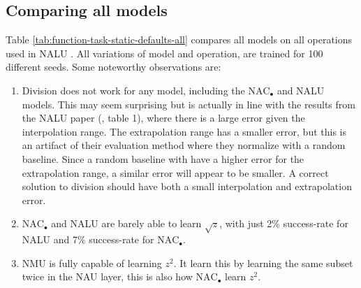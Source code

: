 \subsection{Comparing all models}
\label{sec:appendix:comparison-all-models}

Table \ref{tab:function-task-static-defaults-all} compares all models on all operations used in NALU \cite{trask-nalu}. All variations of model and operation, are trained for 100 different seeds. Some noteworthy observations are:

\begin{enumerate}
    \item Division does not work for any model, including the $\mathrm{NAC}_{\bullet}$ and NALU models. This may seem surprising but is actually in line with the results from the NALU paper (\citet{trask-nalu}, table 1), where there is a large error given the interpolation range. The extrapolation range has a smaller error, but this is an artifact of their evaluation method where they normalize with a random baseline. Since a random baseline with have a higher error for the extrapolation range, a similar error will appear to be smaller. A correct solution to division should have both a small interpolation and extrapolation error.
    \item $\mathrm{NAC}_{\bullet}$ and NALU are barely able to learn $\sqrt{z}$, with just 2\% success-rate for NALU and 7\% success-rate for $\mathrm{NAC}_{\bullet}$.
    \item NMU is fully capable of learning $z^2$. It learn this by learning the same subset twice in the NAU layer, this is also how $\mathrm{NAC}_{\bullet}$ learn $z^2$.
\end{enumerate}


